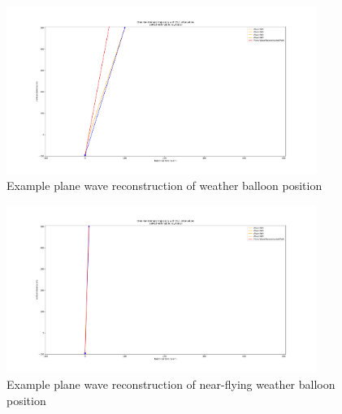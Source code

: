 \documentclass[11pt,a4paper,faculty=we,language=en,doctype=report]{cls/ugent-doc}
\begin{document}
\begin{figure}
	\centering
	\includegraphics[width=0.9\textwidth]{WeatherBalloonPositionReconstruction.pdf}
	\caption{Example plane wave reconstruction of weather balloon position}
	\label{fig:WeatherBalloonPositionReconstruction}
\end{figure}
\begin{figure}
	\centering
	\includegraphics[width=0.9\textwidth]{WeatherBalloonClosePositionReconstruction.pdf}
	\caption{Example plane wave reconstruction of near-flying weather balloon position}
	\label{fig:WeatherBalloonClosePositionReconstruction}
\end{figure}
\newpage
\end{document}
